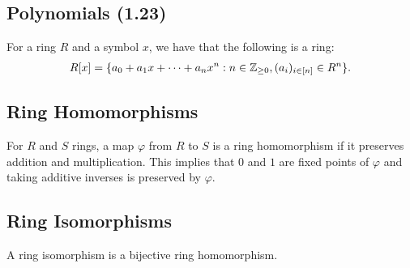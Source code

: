 \subsection{Polynomials (1.23)} \label{1.23}

For a ring $R$ and a symbol $x$, we have that the following is a ring: \begin{align*}
    R[x] = \{a_0 + a_1x + \cdots + a_nx^n : n \in \mathbb{Z}_{\geq 0}, (a_i)_{i \in [n]} \in R^n\}.
\end{align*} 

\subsection{Ring Homomorphisms}

For $R$ and $S$ rings, a map $\varphi$ from $R$ to $S$ is a ring
homomorphism if it preserves addition and multiplication.
This implies that $0$ and $1$ are fixed points of $\varphi$
and taking additive inverses is preserved by $\varphi$.

\subsection{Ring Isomorphisms}

A ring isomorphism is a bijective ring homomorphism.
